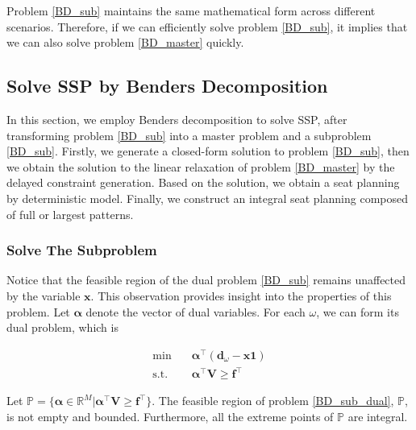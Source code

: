 
Problem \eqref{BD_sub} maintains the same mathematical form across different scenarios. Therefore, if we can efficiently solve problem \eqref{BD_sub}, it implies that we can also solve problem \eqref{BD_master} quickly.

\subsection{Solve SSP by Benders Decomposition}\label{solve_by_benders}
In this section, we employ Benders decomposition to solve SSP, after transforming problem \eqref{BD_sub} into a master problem and a subproblem \eqref{BD_sub}. Firstly, we generate a closed-form solution to problem \eqref{BD_sub}, then we obtain the solution to the linear relaxation of problem \eqref{BD_master} by the delayed constraint generation. Based on the solution, we obtain a seat planning by deterministic model. Finally, we construct an integral seat planning composed of full or largest patterns.

\subsubsection{Solve The Subproblem}\label{second_stage}

Notice that the feasible region of the dual problem \eqref{BD_sub} remains unaffected by the variable $\mathbf{x}$. This observation provides insight into the properties of this problem. Let $\bm{\alpha}$ denote the vector of dual variables. For each $\omega$, we can form its dual problem, which is 

\begin{equation}\label{BD_sub_dual}
  \begin{aligned}
    \min \quad & \bm{\alpha}^{\intercal} (\mathbf{d}_{\omega}- \mathbf{x} \mathbf{1}) \\
    \text {s.t.} \quad & \bm{\alpha}^{\intercal} \mathbf{V} \geq \mathbf{f}^{\intercal}
  \end{aligned}
\end{equation}

\begin{prop}\label{feasible_region}
Let $\mathbb{P} = \{\bm{\alpha} \in \mathbb{R}^{M}|\bm{\alpha}^{\intercal} \mathbf{V} \geq \mathbf{f}^{\intercal}\}$. The feasible region of problem \eqref{BD_sub_dual}, $\mathbb{P}$, is not empty and bounded. Furthermore, all the extreme points of $\mathbb{P}$ are integral. 
\end{prop}

